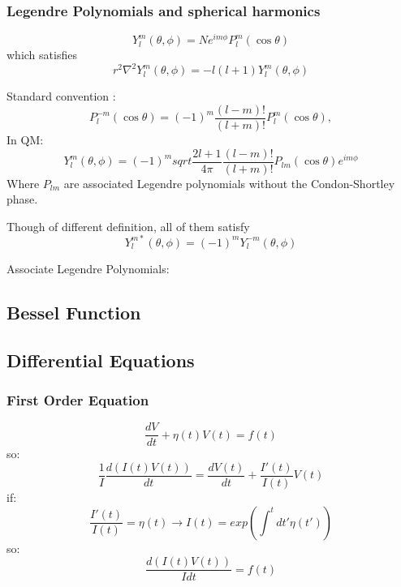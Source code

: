 \subsubsection{Legendre Polynomials and spherical harmonics}
\begin{equation}
    Y^m_l(\theta,\phi)=Ne^{im\phi}P^m_l(\cos\theta)
\end{equation}
which satisfies
\[
    r^2\nabla^2Y^m_l(\theta,\phi)=-l(l+1)Y^m_l(\theta,\phi)
    \]

Standard convention :
\[
    P^{-m}_l(\cos\theta)=(-1)^m\frac{(l-m)!}{(l+m)!}P^m_l(\cos\theta),
\]
In QM:
\[
    Y^m_l(\theta,\phi)=(-1)^msqrt{\frac{2l+1}{4\pi}\frac{(l-m)!}{(l+m)!}}P_{lm}(\cos\theta)e^{im\phi}
\]
Where $P_{lm}$ are associated Legendre polynomials without the
Condon-Shortley phase.

Though of different definition, all of them satisfy
\[ 
    Y_l^{m*}(\theta,\phi)=(-1)^{m}Y_{l}^{-m}(\theta,\phi) 
    \]


Associate Legendre Polynomials:

\subsection{Bessel Function}
\subsection{Differential Equations}

\subsubsection{First Order Equation}
\[ 
\frac{dV}{dt} + \eta(t)V(t) = f(t)  
\]
so:
\[
    \frac{1}{I}\frac{d(I(t)V(t))}{dt} = \frac{dV(t)}{dt} + \frac{I'(t)}{I(t)}V(t)
    \]
if: 
\[ 
    \frac{I'(t)}{I(t)} = \eta(t)	\rightarrow I(t) = exp(\int^{t}dt'\eta(t'))
    \]
so:
\[ \frac{d(I(t)V(t))}{I dt} = f(t)\]

